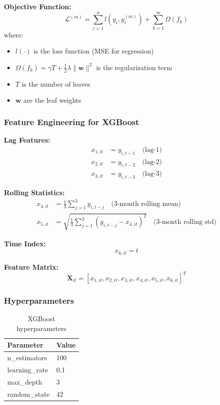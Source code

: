 \documentclass[12pt,a4paper]{article}
\begin{document}
\textbf{Objective Function:}
\begin{equation}
\mathcal{L}^{(m)} = \sum_{i=1}^{n}l(y_i, \hat{y}_i^{(m)}) + \sum_{k=1}^{m}\Omega(f_k)
\end{equation}
where:
\begin{itemize}
    \item $l(\cdot)$ is the loss function (MSE for regression)
    \item $\Omega(f_k) = \gamma T + \frac{1}{2}\lambda \|\mathbf{w}\|^2$ is the regularization term
    \item $T$ is the number of leaves
    \item $\mathbf{w}$ are the leaf weights
\end{itemize}

\subsubsection{Feature Engineering for XGBoost}

\textbf{Lag Features:}
\begin{align}
x_{1,it} &= y_{i,t-1} \quad \text{(lag-1)} \\
x_{2,it} &= y_{i,t-2} \quad \text{(lag-2)} \\
x_{3,it} &= y_{i,t-3} \quad \text{(lag-3)}
\end{align}

\textbf{Rolling Statistics:}
\begin{align}
x_{4,it} &= \frac{1}{3}\sum_{j=1}^{3}y_{i,t-j} \quad \text{(3-month rolling mean)} \\
x_{5,it} &= \sqrt{\frac{1}{3}\sum_{j=1}^{3}(y_{i,t-j} - x_{4,it})^2} \quad \text{(3-month rolling std)}
\end{align}

\textbf{Time Index:}
\begin{equation}
x_{6,it} = t
\end{equation}

\textbf{Feature Matrix:}
\begin{equation}
\mathbf{X}_{it} = [x_{1,it}, x_{2,it}, x_{3,it}, x_{4,it}, x_{5,it}, x_{6,it}]^T
\end{equation}

\subsubsection{Hyperparameters}

\begin{table}[H]
\centering
\begin{tabular}{ll}
\toprule
\textbf{Parameter} & \textbf{Value} \\
\midrule
n\_estimators & 100 \\
learning\_rate & 0.1 \\
max\_depth & 3 \\
random\_state & 42 \\
\bottomrule
\end{tabular}
\caption{XGBoost hyperparameters}
\end{table}
\end{document}
